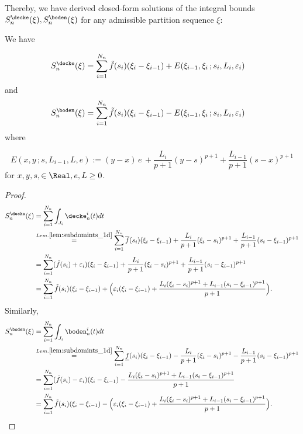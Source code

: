 Thereby, we have derived closed-form solutions of the integral bounds $S^\decke_n (\xi),S^\boden_n (\xi)$ for any admissible partition sequence $\xi$:

\begin{thm} \label{thm:ceilfloorintofxi} We have 

\begin{align} S^\decke_n (\xi) &= \sum_{i=1}^{N_n}  \tilde f(s_i) (\xi_{i} - \xi_{i-1}) + E(\xi_{i-1},\xi_i \,; s_i,L_i,\varepsilon_i)
	\end{align} 
	and 
 \begin{align} S^\boden_n (\xi) &= \sum_{i=1}^{N_n}  \tilde f(s_i) (\xi_{i} - \xi_{i-1}) -  E(\xi_{i-1},\xi_i \,; s_i,L_i,\varepsilon_i)
\end{align}
where 

\[E(x,y \,;s,L_{i-1},L,e) :=  (y - x)\, e \,+ \frac{L_i}{{p+1}} (y-s )^{p+1}+  \frac{L_{i-1}}{{p+1}}(s-x)^{p+1}     \] for 
$x,y,s, \in \Real, e, L \geq 0$.


\begin{proof}
\begin{align*} S^\decke_n (\xi) &= \sum_{i=1}^{N_n} \int_{J_i} \decke^i_n (t) dt \\
&\stackrel{Lem. \ref {lem:subdomints_1d}}{=}  \sum_{i=1}^{N_n} \overline f(s_i) (\xi_{i} - \xi_{i-1}) 
+ \frac{L_i}{{p+1}} (\xi_{i}-s_i )^{p+1}+  \frac{L_{i-1}}{{p+1}}(s_i- \xi_{i-1} )^{p+1}  \\
&= \sum_{i=1}^{N_n} (\tilde f(s_i) + \varepsilon_i) (\xi_{i} - \xi_{i-1})+ \frac{L_i}{{p+1}} (\xi_{i}-s_i )^{p+1}+  \frac{L_{i-1}}{{p+1}}(s_i- \xi_{i-1} )^{p+1} \\
&= \sum_{i=1}^{N_n} \tilde f(s_i) (\xi_{i} - \xi_{i-1})  + \Bigl( \varepsilon_i (\xi_{i} - \xi_{i-1}) +  \frac{L_i (\xi_{i}-s_i )^{p+1}+  L_{i-1}(s_i-\xi_{i-1} )^{p+1} }{p+1} \Bigr).
	\end{align*} 
	Similarly, 
	\begin{align*} S^\boden_n (\xi) &= \sum_{i=1}^{N_n} \int_{J_i} \boden^i_n (t) dt \\
&\stackrel{Lem. \ref {lem:subdomints_1d}}{=}  \sum_{i=1}^{N_n} \underline f(s_i) (\xi_{i} - \xi_{i-1}) - \frac{L_i}{p+1} (\xi_{i}-s_i )^{p+1}-  \frac{L_{i-1}}{{p+1}}(s_i-\xi_{i-1} )^{p+1}  \\
&= \sum_{i=1}^{N_n} (\tilde f(s_i) - \varepsilon_i) (\xi_{i} - \xi_{i-1}) -  \frac{ L_i (\xi_{i}-s_i )^{p+1}+  L_{i-1} (s_i-\xi_{i-1} )^{p+1} }{{p+1}} \\
&= \sum_{i=1}^{N_n} \tilde f(s_i) (\xi_{i} - \xi_{i-1})  - \Bigl( \varepsilon_i (\xi_{i} - \xi_{i-1}) + \frac{ L_i (\xi_{i}-s_i )^{p+1}+  L_{i-1} (s_i-\xi_{i-1})^{p+1} }{{p+1}} \Bigr).
	\end{align*} 
\end{proof}
\end{thm}

